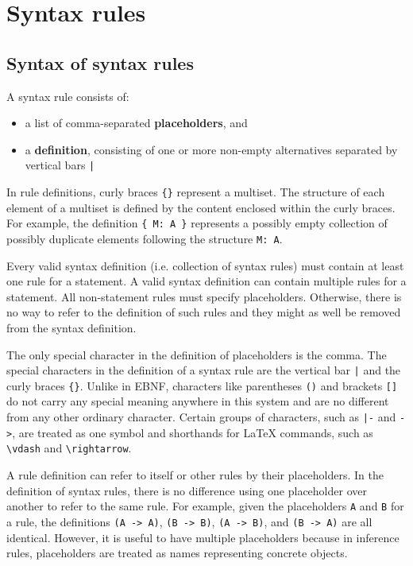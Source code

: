 \chapter{Syntax rules}
\label{chapter:syntax}
\section{Syntax of syntax rules}
\label{syntax:syntax}
A syntax rule consists of:
\begin{itemize}
    \item a list of comma-separated \textbf{placeholders}, and
    \item a \textbf{definition}, consisting of one or more non-empty alternatives separated by vertical bars \lstinline{|} 
\end{itemize}
In rule definitions, curly braces \lstinline|{}| represent a multiset. The structure of each element of a multiset is defined by the content enclosed within the curly braces. For example, the definition \lstinline|{ M: A }| represents a possibly empty collection of possibly duplicate elements following the structure \lstinline{M: A}.

Every valid syntax definition (i.e. collection of syntax rules) must contain at least one rule for a statement. A valid syntax definition can contain multiple rules for a statement. All non-statement rules must specify placeholders. Otherwise, there is no way to refer to the definition of such rules and they might as well be removed from the syntax definition.

The only special character in the definition of placeholders is the comma. The special characters in the definition of a syntax rule are the vertical bar \lstinline{|} and the curly braces \lstinline|{}|. Unlike in EBNF, characters like parentheses \lstinline{()} and brackets \lstinline{[]} do not carry any special meaning anywhere in this system and are no different from any other ordinary character. Certain groups of characters, such as \lstinline{|-} and \lstinline{->}, are treated as one symbol and shorthands for \LaTeX{} commands, such as \lstinline{\vdash} and \lstinline{\rightarrow}.

A rule definition can refer to itself or other rules by their placeholders. In the definition of syntax rules, there is no difference using one placeholder over another to refer to the same rule. For example, given the placeholders \lstinline{A} and \lstinline{B} for a rule, the definitions \lstinline{(A -> A)}, \lstinline{(B -> B)}, \lstinline{(A -> B)}, and \lstinline{(B -> A)} are all identical. However, it is useful to have multiple placeholders because in inference rules, placeholders are treated as names representing concrete objects.

